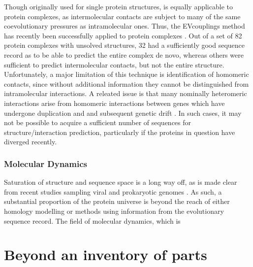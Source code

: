 \documentclass[a4paper,11pt,twoside,openright]{scrbook}
\begin{document}
Though originally used for single protein structures, is equally applicable to protein complexes, as intermolecular contacts are subject to many of the same coevolutionary pressures as intramolecular ones. Thus, the EVcouplings method has recently been successfully applied to protein complexes \cite{Hopf2014}. Out of a set of 82 protein complexes with unsolved structures, 32 had a sufficiently good sequence record as to be able to predict the entire complex de novo, whereas others were sufficient to predict intermolecular contacts, but not the entire structure. Unfortunately, a major limitation of this technique is identification of homomeric contacts, since without additional information they cannot be distinguished  from intramolecular interactions. A releated issue is that many nominally heteromeric interactions arise from homomeric interactions between genes which have undergone duplication and and subsequent genetic drift \cite{Wagner2001,Wagner2003,Fokkens2012}. In such cases, it may not be possible to acquire a sufficient number of sequences for structure/interaction prediction, particularly if the proteins in question have diverged recently.

\subsubsection{Molecular Dynamics}
Saturation of structure and sequence space is a long way off, as is made clear from recent studies sampling viral and prokaryotic genomes \cite{Brum2016,Shi2016,Mukherjee2017}. As such, a substantial proportion of the protein universe is beyond the reach of either homology modelling or methods using information from the evolutionary sequence record. The field of molecular dynamics, which is

\section{Beyond an inventory of parts}

\end{document}
